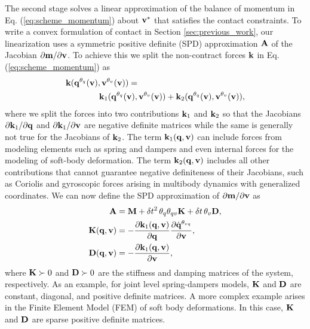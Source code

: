 The second stage solves a linear approximation of the balance of momentum in Eq.
(\ref{eq:scheme_momentum}) about ${\mathbf{v}}^*$ that satisfies the contact
constraints. To write a convex formulation of contact in Section
\ref{sec:previous_work}, our linearization uses a symmetric positive definite
(SPD) approximation ${\mathbf{A}}$ of the Jacobian $\partial {\mathbf{m}}/\partial {\mathbf{v}}$.
To achieve this we split the non-contract forces ${\mathbf{k}}$ in Eq.
(\ref{eq:scheme_momentum}) as
\begin{align*}
	&{\mathbf{k}}({\mathbf{q}}^{\theta_{q}}({\mathbf{v}}), {\mathbf{v}}^{\theta_v}({\mathbf{v}})) = \\
    &\qquad\qquad {\mathbf{k}}_1({\mathbf{q}}^{\theta_{q}}({\mathbf{v}}), {\mathbf{v}}^{\theta_v}({\mathbf{v}}))+
	{\mathbf{k}}_2({\mathbf{q}}^{\theta_{q}}({\mathbf{v}}), {\mathbf{v}}^{\theta_v}({\mathbf{v}})),
\end{align*}
where we split the forces into two contributions ${\mathbf{k}}_1$ and ${\mathbf{k}}_2$ so
that the Jacobians $\partial {\mathbf{k}}_1/\partial{\mathbf{q}}$ and $\partial
{\mathbf{k}}_1/\partial{\mathbf{v}}$ are negative definite matrices while the same is
generally not true for the Jacobians of ${\mathbf{k}}_2$. The term ${\mathbf{k}}_1({\mathbf{q}},
{\mathbf{v}})$ can include forces from modeling elements such as spring and dampers
and even internal forces for the modeling of soft-body deformation. The term
${\mathbf{k}}_2({\mathbf{q}}, {\mathbf{v}})$ includes all other contributions that cannot
guarantee negative definiteness of their Jacobians, such as Coriolis and
gyroscopic forces arising in multibody dynamics with generalized coordinates. We
can now define the SPD approximation of $\partial {\mathbf{m}}/\partial {\mathbf{v}}$ as
\begin{align}
	\mf{A}&=\mf{M}+\delta t^2\,\theta_q\theta_{qv}\mf{K}+\delta t\,\theta_v\mf{D},
	\label{eq:expression_for_A}\\
	\mf{K}(\mf{q}, \mf{v})&=-\frac{\partial \mf{k}_1(\mf{q}, \mf{v})}{\partial
	\mf{q}}\frac{\partial\dot{\mf{q}}^{\theta_{vq}}}{\partial\mf{v}},
	\label{eq:stiffness_matrix}\\
	\mf{D}(\mf{q}, \mf{v})&=-\frac{\partial \mf{k}_1(\mf{q}, \mf{v})}{\partial
	\mf{v}},
	\label{eq:dissipation_matrix}
\end{align}
where ${\mathbf{K}} \succ 0$ and ${\mathbf{D}}\succ 0$ are the stiffness and damping
matrices of the system, respectively. As an example, for joint level
spring-dampers models, ${\mathbf{K}}$ and ${\mathbf{D}}$ are constant, diagonal, and
positive definite matrices. A more complex example arises in the Finite Element
Model (FEM) of soft body deformations. In this case, ${\mathbf{K}}$ and ${\mathbf{D}}$ are
sparse positive definite matrices.

